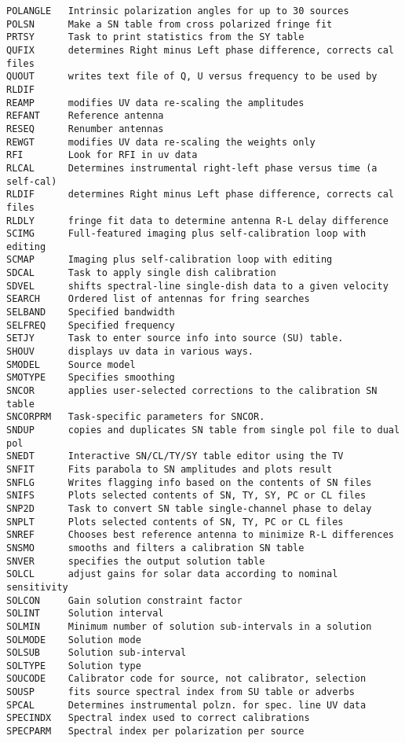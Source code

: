 \begin{verbatim}
POLANGLE   Intrinsic polarization angles for up to 30 sources
POLSN      Make a SN table from cross polarized fringe fit
PRTSY      Task to print statistics from the SY table
QUFIX      determines Right minus Left phase difference, corrects cal files
QUOUT      writes text file of Q, U versus frequency to be used by RLDIF
REAMP      modifies UV data re-scaling the amplitudes
REFANT     Reference antenna
RESEQ      Renumber antennas
REWGT      modifies UV data re-scaling the weights only
RFI        Look for RFI in uv data
RLCAL      Determines instrumental right-left phase versus time (a self-cal)
RLDIF      determines Right minus Left phase difference, corrects cal files
RLDLY      fringe fit data to determine antenna R-L delay difference
SCIMG      Full-featured imaging plus self-calibration loop with editing
SCMAP      Imaging plus self-calibration loop with editing
SDCAL      Task to apply single dish calibration
SDVEL      shifts spectral-line single-dish data to a given velocity
SEARCH     Ordered list of antennas for fring searches
SELBAND    Specified bandwidth
SELFREQ    Specified frequency
SETJY      Task to enter source info into source (SU) table.
SHOUV      displays uv data in various ways.
SMODEL     Source model
SMOTYPE    Specifies smoothing
SNCOR      applies user-selected corrections to the calibration SN table
SNCORPRM   Task-specific parameters for SNCOR.
SNDUP      copies and duplicates SN table from single pol file to dual pol
SNEDT      Interactive SN/CL/TY/SY table editor using the TV
SNFIT      Fits parabola to SN amplitudes and plots result
SNFLG      Writes flagging info based on the contents of SN files
SNIFS      Plots selected contents of SN, TY, SY, PC or CL files
SNP2D      Task to convert SN table single-channel phase to delay
SNPLT      Plots selected contents of SN, TY, PC or CL files
SNREF      Chooses best reference antenna to minimize R-L differences
SNSMO      smooths and filters a calibration SN table
SNVER      specifies the output solution table
SOLCL      adjust gains for solar data according to nominal sensitivity
SOLCON     Gain solution constraint factor
SOLINT     Solution interval
SOLMIN     Minimum number of solution sub-intervals in a solution
SOLMODE    Solution mode
SOLSUB     Solution sub-interval
SOLTYPE    Solution type
SOUCODE    Calibrator code for source, not calibrator, selection
SOUSP      fits source spectral index from SU table or adverbs
SPCAL      Determines instrumental polzn. for spec. line UV data
SPECINDX   Spectral index used to correct calibrations
SPECPARM   Spectral index per polarization per source

\end{verbatim}
